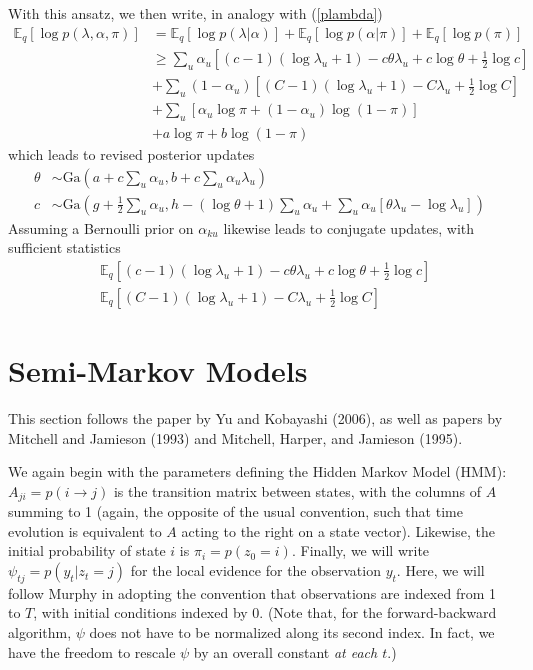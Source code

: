 \documentclass[11pt]{article}
\begin{document}
With this ansatz, we then write, in analogy with (\ref{plambda})
\begin{align}
    \mathbb{E}_q [\log p(\lambda, \alpha, \pi)] &=
    \mathbb{E}_q[\log p(\lambda|\alpha)] + \mathbb{E}_q[\log p(\alpha|\pi)]
    + \mathbb{E}_q[\log p(\pi)] \\
    &\ge \sum_u \alpha_u \left[
    (c - 1) (\log \lambda_u + 1) - c\theta\lambda_u + c \log \theta + \frac{1}{2}\log c\right] \\
    &+ \sum_u (1 - \alpha_u) \left[
        (C - 1)(\log \lambda_u + 1) - C\lambda_u + \frac{1}{2}\log C
     \right] \\
     &+ \sum_u \left[\alpha_u \log \pi + (1 - \alpha_u) \log (1 - \pi)\right] \\
     &+ a \log \pi + b \log (1 - \pi)
\end{align}
which leads to revised posterior updates
\begin{align}
    \theta &\sim \text{Ga}\left(a + c\sum_u \alpha_u, b + c\sum_u \alpha_u\lambda_u \right) \\
    c &\sim \text{Ga}\left(g + \frac{1}{2}\sum_u \alpha_u,
    h - (\log \theta + 1)\sum_u \alpha_u
    + \sum_u \alpha_u \left[ \theta \lambda_u - \log \lambda_u \right]\right)
\end{align}
Assuming a Bernoulli prior on $\alpha_{ku}$ likewise leads to conjugate updates, with sufficient statistics
\begin{align}
    &\mathbb{E}_q \left[
        (c - 1) (\log \lambda_u + 1) - c\theta\lambda_u + c \log \theta + \frac{1}{2}\log c
    \right] \\
    &\mathbb{E}_q \left[
        (C - 1)(\log \lambda_u + 1) - C\lambda_u + \frac{1}{2}\log C
    \right]
\end{align}

\section{Semi-Markov Models}
This section follows the paper by Yu and Kobayashi (2006), as well as papers by Mitchell and Jamieson (1993) and Mitchell, Harper, and Jamieson (1995).

We again begin with the parameters defining the Hidden Markov Model (HMM): $A_{ji} = p({i \rightarrow j})$ is the transition matrix between states, with the columns of $A$ summing to 1 (again, the opposite of the usual convention, such that time evolution is equivalent to $A$ acting to the right on a state vector). Likewise, the initial probability of state $i$ is $\pi_i = p(z_0 = i)$. Finally, we will write $\psi_{tj} = p(y_t|z_t = j)$ for the local evidence for the observation $y_t$. Here, we will follow Murphy in adopting the convention that observations are indexed from 1 to $T$, with initial conditions indexed by 0. (Note that, for the forward-backward algorithm, $\psi$ does not have to be normalized along its second index. In fact, we have the freedom to rescale $\psi$ by an overall constant \emph{at each $t$}.)
\end{document}
